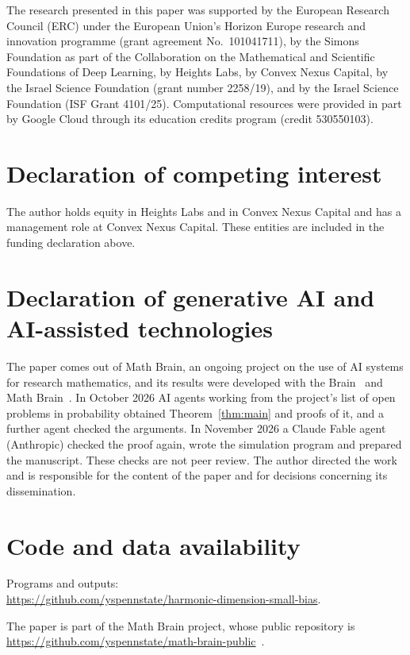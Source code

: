 \documentclass[11pt]{amsart}
\theoremstyle{definition}
\begin{document}
The research presented in this paper was supported by the European Research Council (ERC) under the European Union's
Horizon Europe research and innovation programme (grant agreement No.~101041711), by the Simons Foundation as part of
the Collaboration on the Mathematical and Scientific Foundations of Deep Learning, by Heights Labs, by Convex Nexus
Capital, by the Israel Science Foundation (grant number 2258/19), and by the Israel Science Foundation (ISF Grant
4101/25). Computational resources were provided in part by Google Cloud through its education credits program (credit
530550103).

\section*{Declaration of competing interest}
The author holds equity in Heights Labs and in Convex Nexus Capital and has a management role at Convex Nexus Capital.
These entities are included in the funding declaration above.

\section*{Declaration of generative AI and AI-assisted technologies}
The paper comes out of Math Brain, an ongoing project on the use of AI systems for research mathematics, and its
results were developed with the Brain~\cite{BrainFramework} and Math Brain~\cite{MathBrainRepo}. In October 2026
AI agents working from the project's list of open problems in probability obtained Theorem~\ref{thm:main} and
proofs of it, and a further agent checked the arguments. In November 2026 a
Claude Fable agent (Anthropic) checked the proof again, wrote the simulation program and prepared the manuscript.
These checks are not peer review. The author directed the work and is responsible for the content of the paper and
for decisions concerning its dissemination.

\section*{Code and data availability}
Programs and outputs:\\
\url{https://github.com/yspennstate/harmonic-dimension-small-bias}.

The paper is part of the Math Brain project, whose public repository is
\url{https://github.com/yspennstate/math-brain-public}~\cite{MathBrainRepo}.
\end{document}
